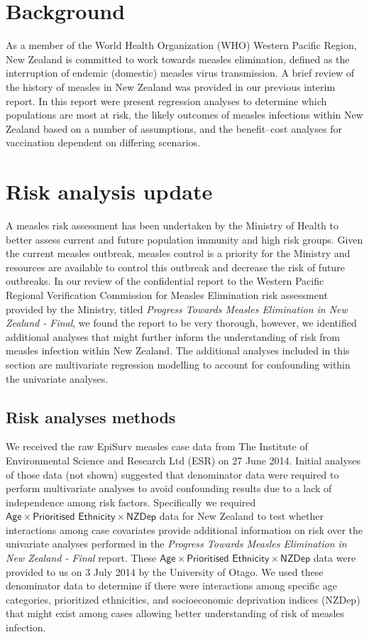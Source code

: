 \documentclass{article}
\begin{document}
\section{Background}

As a member of the World Health Organization (WHO) Western Pacific Region, New Zealand is committed to work towards measles elimination, defined as the interruption of endemic (domestic) measles virus transmission. A brief review of the history of measles in New Zealand was provided in our previous interim report. In this report were present regression analyses to determine which populations are most at risk, the likely outcomes of measles infections within New Zealand based on a number of assumptions, and the benefit--cost analyses for vaccination dependent on differing scenarios. 

\section{Risk analysis update}
\label{sub:risk_analyses}

A measles risk assessment has been undertaken by the Ministry of Health to better assess current and future population immunity and high risk groups. Given the current measles outbreak, measles control is a priority for the Ministry and resources are available to control this outbreak and decrease the risk of future outbreaks. In our review of the confidential report to the Western Pacific Regional Verification Commission for Measles Elimination risk assessment provided by the Ministry, titled \emph {Progress Towards Measles Elimination in New Zealand - Final}, we found the report to be very thorough, however, we identified additional analyses that might further inform the understanding of risk from measles infection within New Zealand. The additional analyses included in this section are multivariate regression modelling to account for confounding within the univariate analyses.

\subsection{Risk analyses methods}
We received the raw EpiSurv measles case data from The Institute of Environmental Science and Research Ltd (ESR) on 27 June 2014. Initial analyses of those data (not shown) suggested that denominator data were required to perform multivariate analyses to avoid confounding results due to a lack of independence among risk factors. Specifically we required $\textsf{Age} \times \textsf{Prioritised Ethnicity} \times \textsf{NZDep}$ data for New Zealand to test whether interactions among case covariates provide additional information on risk over the univariate analyses performed in the \emph{Progress Towards Measles Elimination in New Zealand - Final} report. These $\textsf{Age} \times \textsf{Prioritised Ethnicity} \times \textsf{NZDep}$ data were provided to us on 3 July 2014 by the University of Otago. We used these denominator data to determine if there were interactions among specific age categories, prioritized ethnicities, and socioeconomic deprivation indices (NZDep) that might exist among cases allowing better understanding of risk of measles infection.
\end{document}
